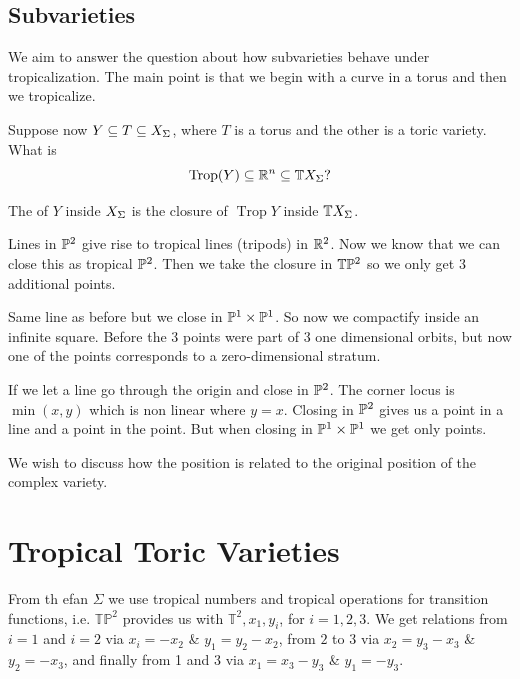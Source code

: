 \documentclass[12pt]{memoir}
\DeclareMathOperator{\Trop}{Trop}
\theoremstyle{definition}
\def\TT{{\mathbb T}}
\def\PP{{\mathbb P}}
\begin{document}
\subsection{Subvarieties}

We aim to answer the question about how subvarieties behave under tropicalization. The main point is that we begin with a curve in a torus and then we tropicalize.\par 
Suppose now $Y\subseteq T\subseteq X_\Sigma$, where $T$ is a torus and the other is a toric variety. What is 
$$\Trop(Y)\subseteq\bR^n\subseteq \bT X_\Sg?$$

\begin{Def}
    The  of $Y$ inside $X_\Sigma$ is the closure of $\Trop Y$ inside $\mathbb{T} X_\Sigma$. 
\end{Def}

\begin{Ex}
    Lines in $\mathbb{P}^2$ give rise to tropical lines (tripods) in $\mathbb{R}^2$. Now we know that we can close this as tropical $\mathbb{P}^2$. Then we take the closure in $\mathbb{T}\mathbb{P}^2$ so we only get 3 additional points. 
\end{Ex}

\begin{Ex}
    Same line as before but we close in $\mathbb{P}^1\times\mathbb{P}^1$. So now we compactify inside an infinite square. Before the 3 points were part of 3 one dimensional orbits, but now one of the points corresponds to a zero-dimensional stratum.
\end{Ex}

\begin{Ex}
    If we let a line go through the origin and close in $\mathbb{P}^2$. The corner locus is $\min(x,y)$ which is non linear where $y=x$. Closing in $\mathbb{P}^2$ gives us a point in a line and a point in the point. But when closing in $\mathbb{P}^1\times\mathbb{P}^1$ we get only points.
\end{Ex}

We wish to discuss how the position is related to the original position of the complex variety.



\section{Tropical Toric Varieties}

From th efan $\Sigma$ we use tropical numbers and tropical operations for transition functions, i.e. $\TT \PP^2$ provides us with $\TT^2, x_1,y_i$, for $i=1,2,3$. We get relations from $i=1$ and $i=2$ via $x_i=-x_2$ \& $y_1=y_2-x_2$, from $2$ to $3$ via $x_2 = y_3-x_3$ \& $y_2 = -x_3$, and finally from 1 and 3 via $x_1 = x_3-y_3$ \& $y_1 = -y_3$.
\end{document}
